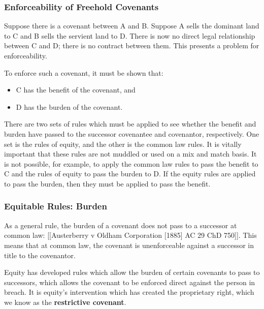 \documentclass[
]{article}
\providecommand{\tightlist}{%
  \setlength{\itemsep}{0pt}\setlength{\parskip}{0pt}}
\begin{document}
\hypertarget{enforceability-of-freehold-covenants}{%
\subsubsection{Enforceability of Freehold
Covenants}\label{enforceability-of-freehold-covenants}}

Suppose there is a covenant between A and B. Suppose A sells the
dominant land to C and B sells the servient land to D. There is now no
direct legal relationship between C and D; there is no contract between
them. This presents a problem for enforceability.

To enforce such a covenant, it must be shown that:

\begin{itemize}
\tightlist
\item
  C has the benefit of the covenant, and
\item
  D has the burden of the covenant.
\end{itemize}

There are two sets of rules which must be applied to see whether the
benefit and burden have passed to the successor covenantee and
covenantor, respectively. One set is the rules of equity, and the other
is the common law rules. It is vitally important that these rules are
not muddled or used on a mix and match basis. It is not possible, for
example, to apply the common law rules to pass the benefit to C and the
rules of equity to pass the burden to D. If the equity rules are applied
to pass the burden, then they must be applied to pass the benefit.

\hypertarget{equitable-rules-burden}{%
\subsubsection{Equitable Rules: Burden}\label{equitable-rules-burden}}

As a general rule, the burden of a covenant does not pass to a successor
at common law: {[}{[}Austerberry v Oldham Corporation {[}1885{]} AC 29
ChD 750{]}{]}. This means that at common law, the covenant is
unenforceable against a successor in title to the covenantor.

Equity has developed rules which allow the burden of certain covenants
to pass to successors, which allows the covenant to be enforced direct
against the person in breach. It is equity's intervention which has
created the proprietary right, which we know as the \textbf{restrictive
covenant}.
\end{document}
